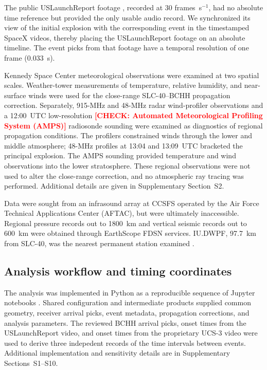 \documentclass[]{seismica}
\newcommand{\checkme}[1]{\textcolor{red}{\textbf{[CHECK: #1]}}}
\begin{document}
The public USLaunchReport footage \citep{uslaunchreport_amos6_video_2016},
recorded at 30 frames~s$^{-1}$, had no absolute time reference but
provided the only usable audio record. We synchronized its view of the
initial explosion with the corresponding event in the timestamped SpaceX
videos, thereby placing the USLaunchReport footage on an absolute
timeline. The event picks from that footage have a temporal resolution
of one frame (0.033~s).

Kennedy Space Center meteorological observations were examined at two
spatial scales. Weather-tower measurements of temperature, relative
humidity, and near-surface winds were used for the close-range SLC-40--BCHH
propagation correction. Separately, 915-MHz and 48-MHz radar wind-profiler
observations and a 12:00~UTC low-resolution
\checkme{Automated Meteorological Profiling System (AMPS)} radiosonde
sounding were examined as diagnostics of regional propagation conditions.
The profilers constrained winds through the lower and middle atmosphere;
48-MHz profiles at 13:04 and 13:09~UTC bracketed the principal explosion.
The AMPS sounding provided temperature and wind observations into the lower
stratosphere. These regional observations were not used to alter the
close-range correction, and no atmospheric ray tracing was performed.
Additional details are given in Supplementary Section~S2.

Data were sought from an infrasound array at CCSFS operated by the Air
Force Technical Applications Center (AFTAC), but were ultimately
inaccessible. Regional pressure records out to 1800~km and vertical
seismic records out to 600~km were obtained through EarthScope FDSN
services. IU.DWPF, 97.7~km from SLC-40, was the nearest permanent station
examined \citep{asl_gsn_iu_1988}.

\subsection{Analysis workflow and timing coordinates}

The analysis was implemented in Python as a reproducible sequence of Jupyter
notebooks \citep{kluyver2016jupyter}. Shared configuration and intermediate
products supplied common geometry, receiver arrival picks, event metadata,
propagation corrections, and analysis parameters. The reviewed BCHH arrival
picks, onset times from the USLaunchReport video, and onset times from the proprietary UCS-3 video
were used to derive three indepedent records of the time intervals between events. Additional
implementation and sensitivity details are in Supplementary Sections~S1--S10.
\end{document}
